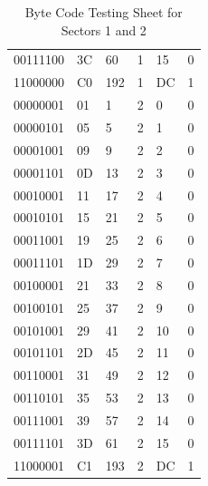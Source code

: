 \documentclass[12pt,a4paper]{report}
\begin{document}
\begin{table}[H]
\begin{tabular}{llllll}
00111100                                               & 3C        & 60            & 1      & 15     & 0       \\
11000000                                               & C0        & 192           & 1      & DC     & 1       \\
00000001                                               & 01        & 1             & 2      & 0      & 0       \\
00000101                                               & 05        & 5             & 2      & 1      & 0       \\
00001001                                               & 09        & 9             & 2      & 2      & 0       \\
00001101                                               & 0D        & 13            & 2      & 3      & 0       \\
00010001                                               & 11        & 17            & 2      & 4      & 0       \\
00010101                                               & 15        & 21            & 2      & 5      & 0       \\
00011001                                               & 19        & 25            & 2      & 6      & 0       \\
00011101                                               & 1D        & 29            & 2      & 7      & 0       \\
00100001                                               & 21        & 33            & 2      & 8      & 0       \\
00100101                                               & 25        & 37            & 2      & 9      & 0       \\
00101001                                               & 29        & 41            & 2      & 10     & 0       \\
00101101                                               & 2D        & 45            & 2      & 11     & 0       \\
00110001                                               & 31        & 49            & 2      & 12     & 0       \\
00110101                                               & 35        & 53            & 2      & 13     & 0       \\
00111001                                               & 39        & 57            & 2      & 14     & 0       \\
00111101                                               & 3D        & 61            & 2      & 15     & 0       \\
11000001                                               & C1        & 193           & 2      & DC     & 1       \\    
\end{tabular}
\caption{Byte Code Testing Sheet for Sectors 1 and 2} %
\label{tab:Testing Table Sectors 1 and 2} 
\end{table}
\end{document}
